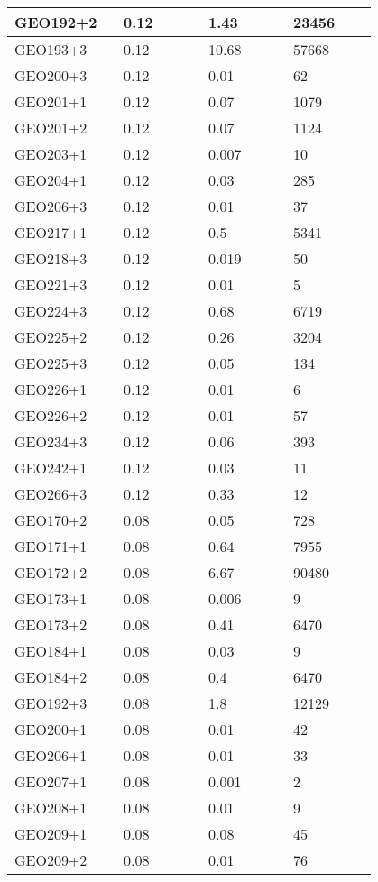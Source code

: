 \begin{longtable}[H]{|p{0.2\linewidth}|p{0.2\linewidth}|p{0.2\linewidth}|p{0.2\linewidth}|}
\hline
GEO192+2 & 0.12 &  1.43 & 23456 \\
\hline
GEO193+3 & 0.12 &  10.68 & 57668 \\
\hline
GEO200+3 & 0.12 &  0.01 & 62 \\
\hline
GEO201+1 & 0.12 &  0.07 & 1079 \\
\hline
GEO201+2 & 0.12 &  0.07 & 1124 \\
\hline
GEO203+1 & 0.12 &  0.007 & 10 \\
\hline
GEO204+1 & 0.12 &  0.03 & 285 \\
\hline
GEO206+3 & 0.12 &  0.01 & 37 \\
\hline
GEO217+1 & 0.12 &  0.5 & 5341 \\
\hline
GEO218+3 & 0.12 &  0.019 & 50 \\
\hline
GEO221+3 & 0.12 &  0.01 & 5 \\
\hline
GEO224+3 & 0.12 &  0.68 & 6719 \\
\hline
GEO225+2 & 0.12 &  0.26 & 3204 \\
\hline
GEO225+3 & 0.12 &  0.05 & 134 \\
\hline
GEO226+1 & 0.12 &  0.01 & 6 \\
\hline
GEO226+2 & 0.12 &  0.01 & 57 \\
\hline
GEO234+3 & 0.12 &  0.06 & 393 \\
\hline
GEO242+1 & 0.12 &  0.03 & 11 \\
\hline
GEO266+3 & 0.12 &  0.33 & 12 \\
\hline
GEO170+2 & 0.08 & 0.05 & 728 \\
\hline
GEO171+1 & 0.08 & 0.64 & 7955 \\
\hline
GEO172+2 & 0.08 & 6.67 & 90480 \\
\hline
GEO173+1 & 0.08 & 0.006 & 9 \\
\hline
GEO173+2 & 0.08 & 0.41 & 6470 \\
\hline
GEO184+1 & 0.08 & 0.03 & 9 \\
\hline
GEO184+2 & 0.08 & 0.4 & 6470 \\
\hline
GEO192+3 & 0.08 & 1.8 & 12129 \\
\hline
GEO200+1 & 0.08 & 0.01 & 42 \\
\hline
GEO206+1 & 0.08 & 0.01 & 33 \\
\hline
GEO207+1 & 0.08 & 0.001 & 2  \\
\hline
GEO208+1 & 0.08 & 0.01 & 9 \\
\hline
GEO209+1 & 0.08 & 0.08 & 45 \\
\hline
GEO209+2 & 0.08 & 0.01 & 76 \\

\end{longtable}
